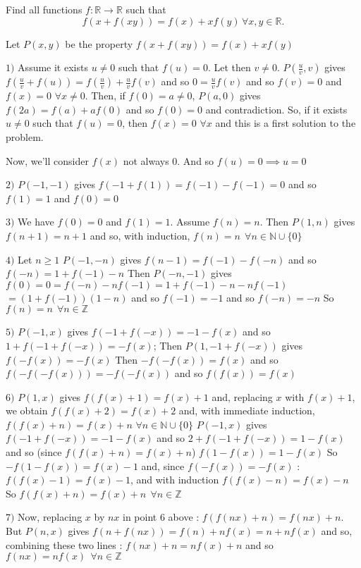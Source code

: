 \begin{mysolution}
	\begin{tcolorbox}Find all functions $ f: \mathbb{R}\to\mathbb{R}$ such that
\[ f(x + f(xy)) = f(x) + xf(y)\,\forall x,y\in\mathbb{R}.
\]
\end{tcolorbox}

Let $ P(x,y)$ be the property $ f(x + f(xy)) = f(x) + xf(y)$

$ 1)$ Assume it exists $ u\neq 0$ such that $ f(u)=0$.
Let then $ v\neq 0$. $ P(\frac{u}{v},v)$ gives $ f(\frac{u}{v} + f(u)) = f(\frac{u}{v}) + \frac{u}{v}f(v)$ and so $ 0=\frac{u}{v}f(v)$ and so $ f(v)=0$ and $ f(x)=0$ $ \forall x \neq 0$.
Then, if $ f(0)=a\neq 0$, $ P(a,0)$ gives $ f(2a)=f(a)+af(0)$ and so $ f(0)=0$ and contradiction.
So, if it exists $ u\neq 0$ such that $ f(u)=0$, then $ f(x)=0$ $ \forall x$ and this is a first solution to the problem.

Now, we'll consider $ f(x)$ not always 0. And so $ \boxed{f(u)=0\implies u=0}$

$ 2)$ $ P(-1,-1)$ gives $ f(-1+f(1))=f(-1)-f(-1)=0$ and so $ \boxed{f(1)=1}$ and $ \boxed{f(0)=0}$

$ 3)$ We have $ f(0)=0$ and $ f(1)=1$. Assume $ f(n)=n$. Then $ P(1,n)$ gives $ f(n+1)=n+1$ and so, with induction, $ \boxed{f(n)=n\: \: \forall n\in\mathbb{N}\cup\{0\}}$

$ 4)$ Let $ n\geq 1$ $ P(-1,-n)$ gives $ f(n-1)=f(-1)-f(-n)$ and so $ f(-n)=1+f(-1)-n$
Then $ P(-n,-1)$ gives $ f(0)=0=f(-n)-nf(-1)=1+f(-1)-n-nf(-1)$$ =(1+f(-1))(1-n)$ and so $ f(-1)=-1$ and so $ f(-n)=-n$
So $ \boxed{f(n)=n\: \: \forall n\in\mathbb{Z}}$

$ 5)$ $ P(-1,x)$ gives $ f(-1+f(-x))=-1-f(x)$ and so $ 1+f(-1+f(-x))=-f(x)$; Then $ P(1,-1+f(-x))$ gives $ \boxed{f(-f(x))=-f(x)}$
Then $ -f(-f(x))=f(x)$ and so $ f(-f(-f(x)))=-f(-f(x))$ and so $ \boxed{f(f(x))=f(x)}$

$ 6)$ $ P(1,x)$ gives $ f(f(x)+1)=f(x)+1$ and, replacing $ x$ with $ f(x)+1$, we obtain $ f(f(x)+2)=f(x)+2$ and, with immediate induction, $ f(f(x)+n)=f(x)+n$ $ \forall n\in\mathbb{N}\cup\{0\}$
$ P(-1,x)$ gives $ f(-1+f(-x))=-1-f(x)$ and so $ 2+f(-1+f(-x))=1-f(x)$ and so (since $ f(f(x)+n)=f(x)+n$) $ f(1-f(x))=1-f(x)$
So $ -f(1-f(x))=f(x)-1$ and, since $ f(-f(x))=-f(x)$ : $ f(f(x)-1)=f(x)-1$, and with induction $ f(f(x)-n)=f(x)-n$
So $ \boxed{f(f(x)+n)=f(x)+n\: \: \forall n\in\mathbb{Z}}$

$ 7)$ Now, replacing $ x$ by $ nx$ in point 6 above : $ f(f(nx)+n)=f(nx)+n$.
But $ P(n,x)$ gives $ f(n+f(nx))=f(n)+nf(x)=n+nf(x)$ and so, combining these two lines : $ f(nx)+n=nf(x)+n$ and so $ \boxed{f(nx)=nf(x)\: \: \forall n\in\mathbb{Z}}$


\end{mysolution}
